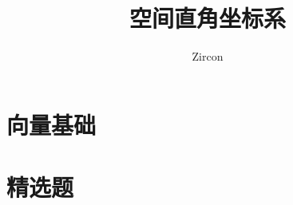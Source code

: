\documentclass[oneside]{book}
\def\notetitle{空间直角坐标系}
\def\noteauthor{Zircon}
\def\notedate{}
\begin{document}
\title{\heiti \LARGE \notetitle \vspace*{8\baselineskip}}
\author{\noteauthor}
\date{\notedate}

\maketitle
\newpage

\setcounter{tocdepth}{1}
\tableofcontents
\newpage

\part{向量基础}




\part{精选题}


\end{document}
